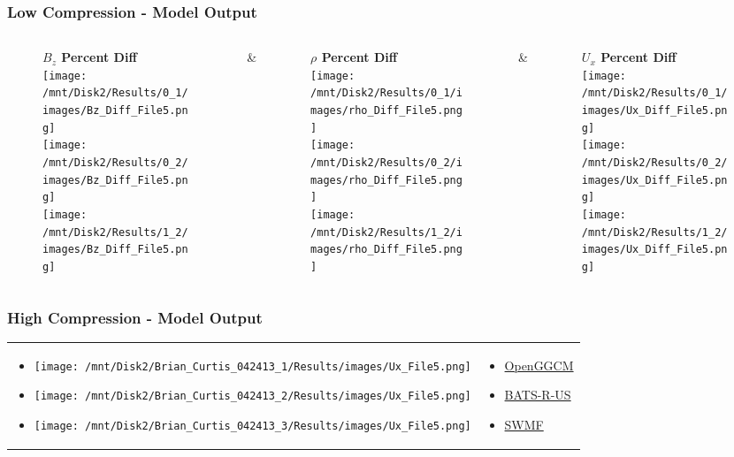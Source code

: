 \begin{frame}
\frametitle{Low Compression - Model Output}
\begin{columns}
\begin{column}{.33\textwidth}
\begin{figure}
	\textbf{$B_z$ Percent Diff}\\
	\texttt{[image: /mnt/Disk2/Results/0\_1/images/Bz\_Diff\_File5.png]}\\
  	\texttt{[image: /mnt/Disk2/Results/0\_2/images/Bz\_Diff\_File5.png]}\\
  	\texttt{[image: /mnt/Disk2/Results/1\_2/images/Bz\_Diff\_File5.png]}
\end{figure}
\end{column}
&
\begin{column}{.33\textwidth}
\begin{figure}
	\textbf{$\rho$ Percent Diff}\\
	\texttt{[image: /mnt/Disk2/Results/0\_1/images/rho\_Diff\_File5.png]}\\
  	\texttt{[image: /mnt/Disk2/Results/0\_2/images/rho\_Diff\_File5.png]}\\
  	\texttt{[image: /mnt/Disk2/Results/1\_2/images/rho\_Diff\_File5.png]}
\end{figure}
\end{column}
&
\begin{column}{.33\textwidth}
\begin{figure}
	\textbf{$U_x$ Percent Diff}\\
	\texttt{[image: /mnt/Disk2/Results/0\_1/images/Ux\_Diff\_File5.png]}\\
  	\texttt{[image: /mnt/Disk2/Results/0\_2/images/Ux\_Diff\_File5.png]}\\
  	\texttt{[image: /mnt/Disk2/Results/1\_2/images/Ux\_Diff\_File5.png]}
\end{figure}
\end{column}
\end{columns}
\end{frame}

\begin{frame}
\frametitle{High Compression - Model Output}
\begin{tabular}{p{}p{}}
\begin{itemize}
  \item[]
  \texttt{[image: /mnt/Disk2/Brian\_Curtis\_042413\_1/Results/images/Ux\_File5.png]}
  \item[]
  \texttt{[image: /mnt/Disk2/Brian\_Curtis\_042413\_2/Results/images/Ux\_File5.png]}
  \item[]
  \texttt{[image: /mnt/Disk2/Brian\_Curtis\_042413\_3/Results/images/Ux\_File5.png]}
\end{itemize}
 &
\begin{itemize}
  \setlength{\itemsep}{43pt}
  \item \href{images/5_HighOpenGGCM.pdf}{OpenGGCM}
  \item \href{images/6_HighBATSRUS.pdf}{BATS-R-US}
  \item \href{images/7_HighSWMF.pdf}{SWMF}
\end{itemize}
\end{tabular}
\end{frame}

